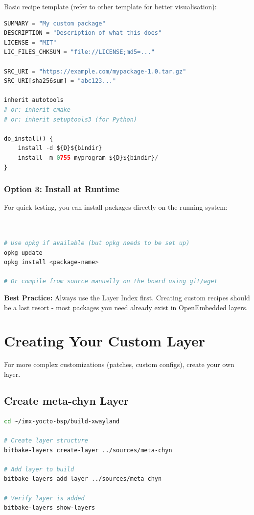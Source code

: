 \documentclass[12pt,a4paper]{report}
\begin{document}
Basic recipe template (refer to other template for better visualisation):

\begin{lstlisting}[language=python]
SUMMARY = "My custom package"
DESCRIPTION = "Description of what this does"
LICENSE = "MIT"
LIC_FILES_CHKSUM = "file://LICENSE;md5=..."

SRC_URI = "https://example.com/mypackage-1.0.tar.gz"
SRC_URI[sha256sum] = "abc123..."

inherit autotools
# or: inherit cmake
# or: inherit setuptools3 (for Python)

do_install() {
    install -d ${D}${bindir}
    install -m 0755 myprogram ${D}${bindir}/
}
\end{lstlisting}

\subsubsection{Option 3: Install at Runtime}

For quick testing, you can install packages directly on the running system:

\begin{lstlisting}[language=bash]


# Use opkg if available (but opkg needs to be set up)
opkg update
opkg install <package-name>

# Or compile from source manually on the board using git/wget
\end{lstlisting}

\begin{important}
\textbf{Best Practice:} Always use the Layer Index first. Creating custom recipes should be a last resort - most packages you need already exist in OpenEmbedded layers.
\end{important}

\section{Creating Your Custom Layer}

For more complex customizations (patches, custom configs), create your own layer.

\subsection{Create meta-chyn Layer}

\begin{lstlisting}[language=bash]
cd ~/imx-yocto-bsp/build-xwayland

# Create layer structure
bitbake-layers create-layer ../sources/meta-chyn

# Add layer to build
bitbake-layers add-layer ../sources/meta-chyn

# Verify layer is added
bitbake-layers show-layers
\end{lstlisting}
\end{document}
